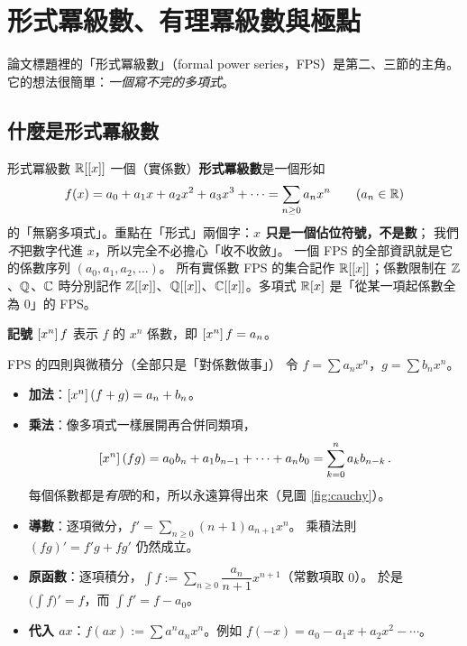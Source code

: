 \section{形式冪級數、有理冪級數與極點}\label{sec:fps}

論文標題裡的「形式冪級數」（formal power series，FPS）是第二、三節的主角。
它的想法很簡單：\emph{一個寫不完的多項式}。

\subsection{什麼是形式冪級數}

\begin{prereq}{形式冪級數 $\mathbb{R}[[x]]$}
一個（實係數）\textbf{形式冪級數}是一個形如
\[
  f(x)=a_0+a_1x+a_2x^2+a_3x^3+\cdots=\sum_{n\ge0}a_nx^n\qquad(a_n\in\mathbb{R})
\]
的「無窮多項式」。重點在「形式」兩個字：\textbf{$x$ 只是一個佔位符號，不是數}；
我們\emph{不}把數字代進 $x$，所以完全不必擔心「收不收斂」。
一個 FPS 的全部資訊就是它的係數序列 $(a_0,a_1,a_2,\ldots)$。
所有實係數 FPS 的集合記作 $\mathbb{R}[[x]]$；係數限制在 $\mathbb{Z}$、$\mathbb{Q}$、$\mathbb{C}$ 時分別記作
$\mathbb{Z}[[x]]$、$\mathbb{Q}[[x]]$、$\mathbb{C}[[x]]$。多項式 $\mathbb{R}[x]$ 是「從某一項起係數全為 $0$」的 FPS。

\textbf{記號} $[x^{n}]\,f$ 表示 $f$ 的 $x^n$ 係數，即 $[x^{n}]\,f=a_n$。
\end{prereq}

\begin{prereq}{FPS 的四則與微積分（全部只是「對係數做事」）}
令 $f=\sum a_nx^n$，$g=\sum b_nx^n$。
\begin{itemize}
  \item \textbf{加法}：$[x^{n}]\,(f+g)=a_n+b_n$。
  \item \textbf{乘法}：像多項式一樣展開再合併同類項，
        \[
          [x^{n}]\,(fg)=a_0b_n+a_1b_{n-1}+\cdots+a_nb_0=\sum_{k=0}^{n}a_kb_{n-k}\,.
        \]
        每個係數都是\emph{有限}的和，所以永遠算得出來（見圖 \ref{fig:cauchy}）。
  \item \textbf{導數}：逐項微分，$f'=\sum_{n\ge0}(n+1)a_{n+1}x^n$。
        乘積法則 $(fg)'=f'g+fg'$ 仍然成立。
  \item \textbf{原函數}：逐項積分，$\int f:=\sum_{n\ge0}\dfrac{a_n}{n+1}x^{n+1}$（常數項取 $0$）。
        於是 $\big(\int f\big)'=f$，而 $\int f'=f-a_0$。
  \item \textbf{代入 $ax$}：$f(ax):=\sum a^na_nx^n$。例如 $f(-x)=a_0-a_1x+a_2x^2-\cdots$。
\end{itemize}
\end{prereq}


